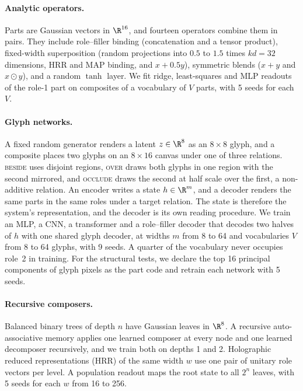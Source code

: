\paragraph{Analytic operators.} Parts are Gaussian vectors in $\R^{16}$, and fourteen operators combine them in pairs. They include role--filler binding (concatenation and a tensor product), fixed-width superposition (random projections into $0.5$ to $1.5$ times $kd = 32$ dimensions, HRR and MAP binding, and $x + 0.5y$), symmetric blends ($x + y$ and $x \odot y$), and a random $\tanh$ layer. We fit ridge, least-squares and MLP readouts of the role-1 part on composites of a vocabulary of $V$ parts, with 5 seeds for each $V$.

\paragraph{Glyph networks.} A fixed random generator renders a latent $z \in \R^{8}$ as an $8 \times 8$ glyph, and a composite places two glyphs on an $8 \times 16$ canvas under one of three relations. \textsc{beside} uses disjoint regions, \textsc{over} draws both glyphs in one region with the second mirrored, and \textsc{occlude} draws the second at half scale over the first, a non-additive relation. An encoder writes a state $h \in \R^m$, and a decoder renders the same parts in the same roles under a target relation. The state is therefore the system's representation, and the decoder is its own reading procedure. We train an MLP, a CNN, a transformer and a role--filler decoder that decodes two halves of $h$ with one shared glyph decoder, at widths $m$ from 8 to 64 and vocabularies $V$ from 8 to 64 glyphs, with 9 seeds. A quarter of the vocabulary never occupies role~2 in training. For the structural tests, we declare the top 16 principal components of glyph pixels as the part code and retrain each network with 5 seeds.

\paragraph{Recursive composers.} Balanced binary trees of depth $n$ have Gaussian leaves in $\R^8$. A recursive auto-associative memory \citep{pollack1990} applies one learned composer at every node and one learned decomposer recursively, and we train both on depths 1 and 2. Holographic reduced representations (HRR) of the same width $w$ use one pair of unitary role vectors per level. A population readout maps the root state to all $2^n$ leaves, with 5 seeds for each $w$ from 16 to 256.

